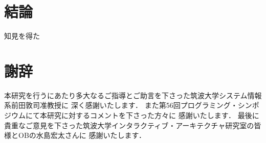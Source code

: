 \documentclass[a4paper,11pt,dvipdfmx]{jreport}
\makeatletter
\renewenvironment{thebibliography}[1]%
{\chapter*{\bibname\@mkboth{\bibname}{\bibname}}%
	\addcontentsline{toc}{chapter}{\numberline{}\bibname}%
	\list{\@biblabel{\@arabic\c@enumiv}}%
	{\settowidth\labelwidth{\@biblabel{#1}}%
		\leftmargin\labelwidth
		\advance\leftmargin\labelsep
		\@openbib@code
		\usecounter{enumiv}%
		\let\p@enumiv\@empty
		\renewcommand\theenumiv{\@arabic\c@enumiv}}%
	\sloppy
	\clubpenalty4000
	\@clubpenalty\clubpenalty
	\widowpenalty4000%
	\sfcode`\.\@m}
{\def\@noitemerr
	{\@latex@warning{Empty `thebibliography' environment}}%
	\endlist}
\makeatother
\begin{document}
\chapter{結論}

知見を得た

\chapter*{謝辞}

本研究を行うにあたり多大なるご指導とご助言を下さった筑波大学システム情報系前田敦司准教授に
深く感謝いたします．
また第56回プログラミング・シンポジウムにて本研究に対するコメントを下さった方々に
感謝いたします．
最後に貴重なご意見を下さった筑波大学インタラクティブ・アーキテクチャ研究室の皆様とOBの水島宏太さんに
感謝いたします．

\newpage

\renewcommand{\bibname}{参考文献}




%
%
\end{document}
